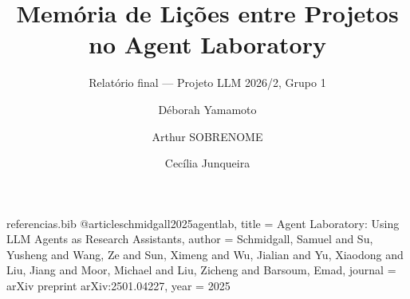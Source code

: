 
\begin{filecontents*}[overwrite]{referencias.bib}
@article{schmidgall2025agentlab,
  title   = {Agent Laboratory: Using {LLM} Agents as Research Assistants},
  author  = {Schmidgall, Samuel and Su, Yusheng and Wang, Ze and Sun, Ximeng
             and Wu, Jialian and Yu, Xiaodong and Liu, Jiang and Moor, Michael
             and Liu, Zicheng and Barsoum, Emad},
  journal = {arXiv preprint arXiv:2501.04227},
  year    = {2025}
}
\end{filecontents*}

\documentclass[sigconf]{acmart}
\usepackage[brazil]{babel}


\renewcommand\footnotetextcopyrightpermission[1]{}
\pagestyle{plain}



\title{Memória de Lições entre Projetos no Agent Laboratory}
\subtitle{Relatório final --- Projeto LLM 2026/2, Grupo 1}

\author{Déborah Yamamoto}

\author{Arthur SOBRENOME} %

\author{Cecília Junqueira}

\renewcommand{\shortauthors}{Yamamoto, SOBRENOME e Junqueira}

\begin{abstract}
O Agent Laboratory é um sistema de múltiplos agentes LLM que conduz
autonomamente um projeto de pesquisa, da revisão de literatura ao relatório,
mas descarta ao fim de cada projeto todo o feedback recebido. Propomos uma
memória de lições que sobrevive entre projetos: o feedback é condensado em
lições do tipo ``o que deu errado e como evitar'' e reaproveitado nos projetos
seguintes. Comparamos o sistema original com duas versões com memória, uma
alimentada pelo revisor LLM e outra por feedback humano, para avaliar se
guardar lições ajuda e se a origem da lição importa.
\end{abstract}

